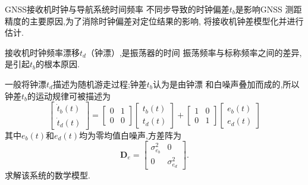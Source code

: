 \documentclass[cn,10pt,citestyle=gb7714-2015,bibstyle=gb7714-2015]{elegantbook}
\begin{document}
\begin{example}
  \textup{GNSS}接收机时钟与导航系统时间频率
  不同步导致的时钟偏差$t_b$是影响\textup{GNSS}
  测距精度的主要原因,为了消除时钟偏差对定位结果的影响,
  将接收机钟差模型化并进行估计.
  
  接收机时钟频率漂移$t_d$（钟漂）,是振荡器的时间
  振荡频率与标称频率之间的差异,是引起$t_b$的根本原因.

  一般将钟漂$t_d$描述为随机游走过程;钟差$t_b$认为是由钟漂
  和白噪声叠加而成的,所以钟差$t_b$的运动规律可被描述为
  \[
      \begin{bmatrix}
        \dot{t}_b(t)\\
        \dot{t}_d(t)
      \end{bmatrix}=
      \begin{bmatrix}
        0&1\\
        0&0
      \end{bmatrix}
      \begin{bmatrix}
        t_b(t)\\
        t_d(t)
      \end{bmatrix}+
      \begin{bmatrix}
        1&0\\
        0&1
      \end{bmatrix}
      \begin{bmatrix}
        e_b(t)\\
        e_d(t)
      \end{bmatrix}
  \]
  其中$e_b(t)$和$e_d(t)$均为零均值白噪声,方差阵为
  \[
      \bm{D}_e=\begin{bmatrix}
        \sigma_{e_b}^2&0\\
        0&\sigma_{e_d}^2
      \end{bmatrix}.
  \]
  求解该系统的数学模型.
\end{example}
\end{document}
